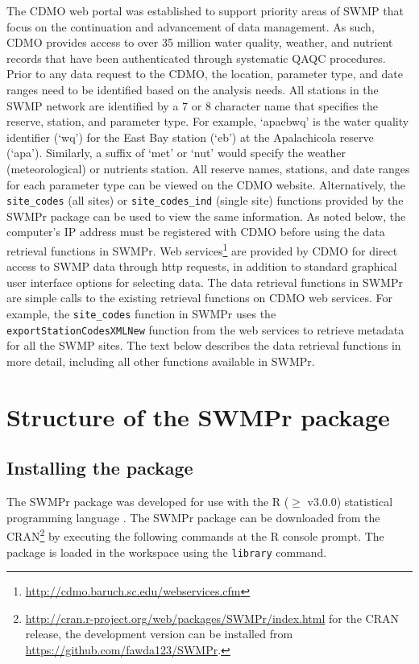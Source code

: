 \documentclass[10pt,letterpaper]{article}\usepackage[]{graphicx}\usepackage[]{color}
\begin{document}
The \ac{CDMO} web portal was established to support priority areas of \ac{SWMP} that focus on the continuation and advancement of data management.  As such, \ac{CDMO} provides access to over 35 million water quality, weather, and nutrient records that have been authenticated through systematic \ac{QAQC} procedures.    Prior to any data request to the \ac{CDMO}, the location, parameter type, and date ranges need to be identified based on the analysis needs. All stations in the \ac{SWMP} network are identified by a 7 or 8 character name that specifies the reserve, station, and parameter type.  For example, `apaebwq' is the water quality identifier (`wq') for the East Bay station (`eb') at the Apalachicola reserve (`apa').  Similarly, a suffix of `met' or `nut' would specify the weather (meteorological) or nutrients station.  All reserve names, stations, and date ranges for each parameter type can be viewed on the \ac{CDMO} website. Alternatively, the \texttt{site\_codes} (all sites) or \texttt{site\_codes\_ind} (single site) functions provided by the SWMPr package can be used to view the same information.  As noted below, the computer's IP address must be registered with \ac{CDMO} before using the data retrieval functions in SWMPr.  Web services\footnote{\url{http://cdmo.baruch.sc.edu/webservices.cfm}} are provided by \ac{CDMO} for direct access to \ac{SWMP} data through http requests, in addition to standard graphical user interface options for selecting data.  The data retrieval functions in SWMPr are simple calls to the existing retrieval functions on \ac{CDMO} web services.  For example, the \texttt{site\_codes} function in SWMPr uses the \texttt{exportStationCodesXMLNew} function from the web services to retrieve metadata for all the \ac{SWMP} sites.  The text below describes the data retrieval functions in more detail, including all other functions available in SWMPr.

\section*{Structure of the SWMPr package}

\subsection*{Installing the package}

The SWMPr package was developed for use with the R ($\geq$ v3.0.0) statistical programming language \cite{RDCT14}. The SWMPr package can be downloaded from the \ac{CRAN}\footnote{\url{http://cran.r-project.org/web/packages/SWMPr/index.html} for the \ac{CRAN} release, the development version can be installed  from \url{https://github.com/fawda123/SWMPr}.} by executing the following commands at the R console prompt.  The package is loaded in the workspace using the \texttt{library} command.
\end{document}
